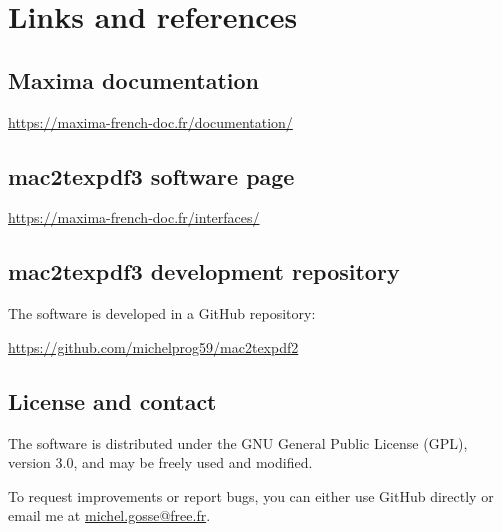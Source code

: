 \documentclass[a4paper,11pt]{article}
\begin{document}
\section*{Links and references}
\subsection*{Maxima documentation}
\url{https://maxima-french-doc.fr/documentation/}

\subsection*{mac2texpdf3 software page}
\url{https://maxima-french-doc.fr/interfaces/}

\subsection*{mac2texpdf3 development repository}
The software is developed in a GitHub repository:

\url{https://github.com/michelprog59/mac2texpdf2}

\subsection*{License and contact}
The software is distributed under the GNU General Public License (GPL), version 3.0, and may be freely used and modified.

To request improvements or report bugs, you can either use GitHub directly or email me at \href{mailto:michel.gosse@free.fr}{michel.gosse@free.fr}.
\end{document}
